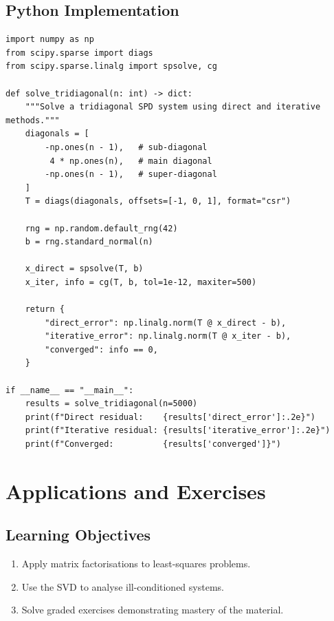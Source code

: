 \documentclass[
    language=english,
    doctype=lecture-notes,
    institution=none,
]{../../omnilatex}
\begin{document}
\section{Python Implementation}

\begin{listing}[htbp]
\centering
\begin{verbatim}
import numpy as np
from scipy.sparse import diags
from scipy.sparse.linalg import spsolve, cg

def solve_tridiagonal(n: int) -> dict:
    """Solve a tridiagonal SPD system using direct and iterative methods."""
    diagonals = [
        -np.ones(n - 1),   # sub-diagonal
         4 * np.ones(n),   # main diagonal
        -np.ones(n - 1),   # super-diagonal
    ]
    T = diags(diagonals, offsets=[-1, 0, 1], format="csr")

    rng = np.random.default_rng(42)
    b = rng.standard_normal(n)

    x_direct = spsolve(T, b)
    x_iter, info = cg(T, b, tol=1e-12, maxiter=500)

    return {
        "direct_error": np.linalg.norm(T @ x_direct - b),
        "iterative_error": np.linalg.norm(T @ x_iter - b),
        "converged": info == 0,
    }

if __name__ == "__main__":
    results = solve_tridiagonal(n=5000)
    print(f"Direct residual:    {results['direct_error']:.2e}")
    print(f"Iterative residual: {results['iterative_error']:.2e}")
    print(f"Converged:          {results['converged']}")
\end{verbatim}
\caption{Tridiagonal solver using SciPy's sparse linear algebra.}
\label{lst:solver}
\end{listing}

\chapter{Applications and Exercises}

\section*{Learning Objectives}
\begin{enumerate}[label=\textbf{LO\arabic*.}, leftmargin=3em]
    \item Apply matrix factorisations to least-squares problems.
    \item Use the SVD to analyse ill-conditioned systems.
    \item Solve graded exercises demonstrating mastery of the material.
\end{enumerate}
\end{document}
